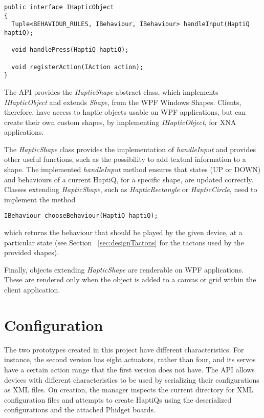 \lstset{style=sharpc1}
\begin{lstlisting}[caption={IHapticObject},label={lst:IHapticObject}]
public interface IHapticObject 
{
  Tuple<BEHAVIOUR_RULES, IBehaviour, IBehaviour> handleInput(HaptiQ haptiQ);
  
  void handlePress(HaptiQ haptiQ);
  
  void registerAction(IAction action);
}
\end{lstlisting}

The API provides the \textit{HapticShape} abstract class, which implements \textit{IHapticObject} and extends \textit{Shape}, from the WPF Windows Shapes. Clients, therefore, have access to haptic objects usable on WPF applications, but can create their own custom shapes, by implementing \textit{IHapticObject}, for XNA applications. 

The \textit{HapticShape} class provides the implementation of \textit{handleInput} and provides other useful functions, such as the possibility to add textual information to a shape. The implemented \textit{handleInput} method ensures that states (UP or DOWN) and behaviours of a current HaptiQ, for a specific shape, are updated correctly. Classes extending \textit{HapticShape}, such as \textit{HapticRectangle} or \textit{HapticCircle}, need to implement the method

\lstset{style=sharpc1}
\begin{lstlisting}
IBehaviour chooseBehaviour(HaptiQ haptiQ);
\end{lstlisting}

which returns the behaviour that should be played by the given device, at a particular state (see Section ~\ref{sec:designTactons} for the tactons used by the provided shapes).

Finally, objects extending \textit{HapticShape} are renderable on WPF applications. These are rendered only when the object is added to a canvas or grid within the client application.

\section{Configuration}
\label{sec:configuration}

The two prototypes created in this project have different characteristics. For instance, the second version has eight actuators, rather than four, and its servos have a certain action range that the first version does not have. The API allows devices with different characteristics to be used by serializing their configurations as XML files. On creation, the manager inspects the current directory for XML configuration files and attempts to create HaptiQs using the deserialized configurations and the attached Phidget boards.  

